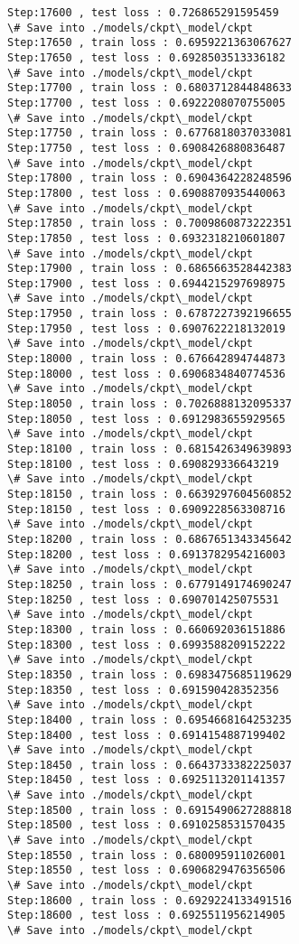 \documentclass[11pt]{article}
\begin{document}
\begin{Verbatim}[commandchars=\\\{\}]
Step:17600 , test loss : 0.726865291595459
\# Save into ./models/ckpt\_model/ckpt
Step:17650 , train loss : 0.6959221363067627
Step:17650 , test loss : 0.6928503513336182
\# Save into ./models/ckpt\_model/ckpt
Step:17700 , train loss : 0.6803712844848633
Step:17700 , test loss : 0.6922208070755005
\# Save into ./models/ckpt\_model/ckpt
Step:17750 , train loss : 0.6776818037033081
Step:17750 , test loss : 0.6908426880836487
\# Save into ./models/ckpt\_model/ckpt
Step:17800 , train loss : 0.6904364228248596
Step:17800 , test loss : 0.6908870935440063
\# Save into ./models/ckpt\_model/ckpt
Step:17850 , train loss : 0.7009860873222351
Step:17850 , test loss : 0.6932318210601807
\# Save into ./models/ckpt\_model/ckpt
Step:17900 , train loss : 0.6865663528442383
Step:17900 , test loss : 0.6944215297698975
\# Save into ./models/ckpt\_model/ckpt
Step:17950 , train loss : 0.6787227392196655
Step:17950 , test loss : 0.6907622218132019
\# Save into ./models/ckpt\_model/ckpt
Step:18000 , train loss : 0.676642894744873
Step:18000 , test loss : 0.6906834840774536
\# Save into ./models/ckpt\_model/ckpt
Step:18050 , train loss : 0.7026888132095337
Step:18050 , test loss : 0.6912983655929565
\# Save into ./models/ckpt\_model/ckpt
Step:18100 , train loss : 0.6815426349639893
Step:18100 , test loss : 0.690829336643219
\# Save into ./models/ckpt\_model/ckpt
Step:18150 , train loss : 0.6639297604560852
Step:18150 , test loss : 0.6909228563308716
\# Save into ./models/ckpt\_model/ckpt
Step:18200 , train loss : 0.6867651343345642
Step:18200 , test loss : 0.6913782954216003
\# Save into ./models/ckpt\_model/ckpt
Step:18250 , train loss : 0.6779149174690247
Step:18250 , test loss : 0.690701425075531
\# Save into ./models/ckpt\_model/ckpt
Step:18300 , train loss : 0.660692036151886
Step:18300 , test loss : 0.6993588209152222
\# Save into ./models/ckpt\_model/ckpt
Step:18350 , train loss : 0.6983475685119629
Step:18350 , test loss : 0.691590428352356
\# Save into ./models/ckpt\_model/ckpt
Step:18400 , train loss : 0.6954668164253235
Step:18400 , test loss : 0.6914154887199402
\# Save into ./models/ckpt\_model/ckpt
Step:18450 , train loss : 0.6643733382225037
Step:18450 , test loss : 0.6925113201141357
\# Save into ./models/ckpt\_model/ckpt
Step:18500 , train loss : 0.6915490627288818
Step:18500 , test loss : 0.6910258531570435
\# Save into ./models/ckpt\_model/ckpt
Step:18550 , train loss : 0.680095911026001
Step:18550 , test loss : 0.6906829476356506
\# Save into ./models/ckpt\_model/ckpt
Step:18600 , train loss : 0.6929224133491516
Step:18600 , test loss : 0.6925511956214905
\# Save into ./models/ckpt\_model/ckpt

\end{Verbatim}
\end{document}
